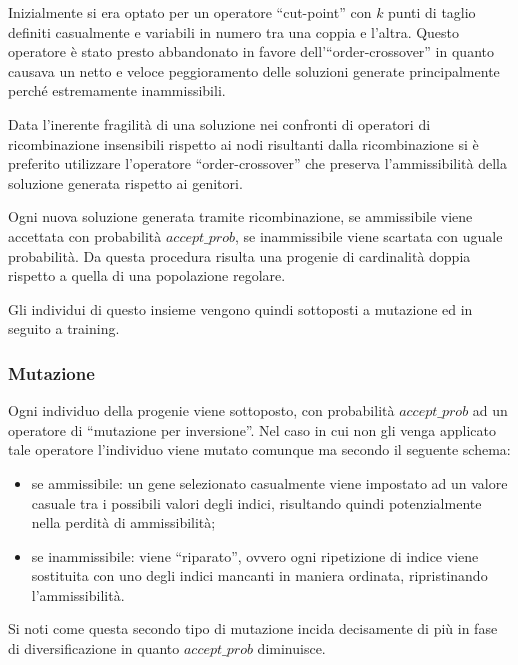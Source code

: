 \documentclass[a4paper]{article}
\begin{document}
            Inizialmente si era optato per un operatore ``cut-point'' con $k$ punti di taglio definiti casualmente e variabili
            in numero tra una coppia e l'altra.
            Questo operatore \`e stato presto abbandonato in favore dell'``order-crossover'' in quanto causava un netto e veloce
            peggioramento delle soluzioni generate principalmente perch\'e estremamente inammissibili.

            Data l'inerente fragilit\`a di una soluzione nei confronti di operatori di ricombinazione insensibili rispetto ai nodi
            risultanti dalla ricombinazione si \`e preferito utilizzare l'operatore ``order-crossover'' che preserva l'ammissibilit\`a
            della soluzione generata rispetto ai genitori.

            Ogni nuova soluzione generata tramite ricombinazione, se ammissibile viene accettata con probabilit\`a $accept\_prob$,
            se inammissibile viene scartata con uguale probabilit\`a.
            Da questa procedura risulta una progenie di cardinalit\`a doppia rispetto a quella di una popolazione regolare.

            Gli individui di questo insieme vengono quindi sottoposti a mutazione ed in seguito a training.

            \subsubsection{Mutazione}
                Ogni individuo della progenie viene sottoposto, con probabilit\`a $accept\_prob$ ad un operatore di ``mutazione per inversione''.
                Nel caso in cui non gli venga applicato tale operatore l'individuo viene mutato comunque ma secondo il seguente schema:
                \begin{itemize}
                    \item se ammissibile: un gene selezionato casualmente viene impostato ad un valore casuale tra i possibili valori degli indici,
                        risultando quindi potenzialmente nella perdit\`a di ammissibilit\`a;
                    \item se inammissibile: viene ``riparato'', ovvero ogni ripetizione di indice viene sostituita con uno degli indici mancanti in maniera ordinata,
                        ripristinando l'ammissibilit\`a.
                \end{itemize}

                Si noti come questa secondo tipo di mutazione incida decisamente di pi\`u in fase di diversificazione in quanto $accept\_prob$ diminuisce.
\end{document}

